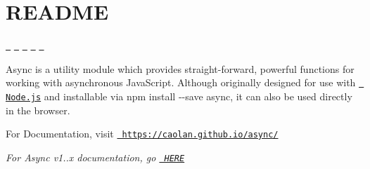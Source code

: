 \chapter{README}
\hypertarget{md__c_1_2_users_2_s_t_r_i_d_e_r_2source_2repos_2_ainslie_a_p_i_2wwwroot_2lib_2jquery-ui_2node__m47e6318395938c08980a0d99c89ad32a}{}\label{md__c_1_2_users_2_s_t_r_i_d_e_r_2source_2repos_2_ainslie_a_p_i_2wwwroot_2lib_2jquery-ui_2node__m47e6318395938c08980a0d99c89ad32a}


\href{https://travis-ci.org/caolan/async}{\texttt{ }} \href{https://www.npmjs.com/package/async}{\texttt{ }} \href{https://coveralls.io/r/caolan/async?branch=master}{\texttt{ }} \href{https://gitter.im/caolan/async?utm_source=badge&utm_medium=badge&utm_campaign=pr-badge&utm_content=badge}{\texttt{ }} \href{https://www.libhive.com/providers/npm/packages/async}{\texttt{ }}

Async is a utility module which provides straight-\/forward, powerful functions for working with asynchronous Java\+Script. Although originally designed for use with \href{https://nodejs.org/}{\texttt{ Node.\+js}} and installable via {\ttfamily npm install -\/-\/save async}, it can also be used directly in the browser.

For Documentation, visit \href{https://caolan.github.io/async/}{\texttt{ https\+://caolan.\+github.\+io/async/}}

{\itshape For Async v1..\+x documentation, go \href{https://github.com/caolan/async/blob/v1.5.2/README.md}{\texttt{ HERE}}} 